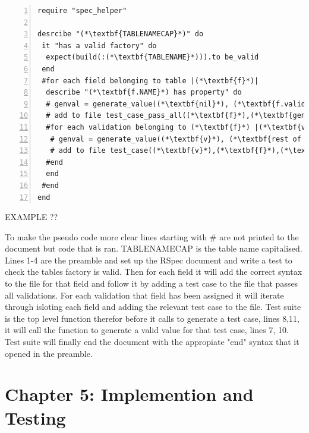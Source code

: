 \documentclass[a4paper,12pt]{article}
\begin{document}
\begin{lstlisting}[frame=single,numbers=left,caption= {Pseudo code for value generation} label={psuedo:suite}]
require "spec_helper"

desrcibe "(*\textbf{TABLENAMECAP}*)" do
 it "has a valid factory" do
  expect(build(:(*\textbf{TABLENAME}*))).to be_valid
 end
 #for each field belonging to table |(*\textbf{f}*)|
  describe "(*\textbf{f.NAME}*) has property" do
  # genval = generate_value((*\textbf{nil}*), (*\textbf{f.validations}*))
  # add to file test_case_pass_all((*\textbf{f}*),(*\textbf{genval}*))
  #for each validation belonging to (*\textbf{f}*) |(*\textbf{v}*)|
   # genval = generate_value((*\textbf{v}*), (*\textbf{rest of validations}*))
   # add to file test_case((*\textbf{v}*),(*\textbf{f}*),(*\textbf{genval}*))
  #end
  end
 #end
end
\end{lstlisting}
\par EXAMPLE ??
\par To make the pseudo code more clear lines starting with \# are not printed to the document but code that is ran. TABLENAMECAP is the table name capitalised. Lines 1-4 are the preamble and set up the RSpec document and write a test to check the tables factory is valid. Then for each field it will add the correct syntax to the file for that field and follow it by adding a test case to the file that passes all validations. For each validation that field has been assigned it will iterate through isloting each field and adding the relevant test case to the file. Test suite is the top level function therefor before it calls to generate a test case, lines 8,11, it will call the function to generate a valid value for that test case, lines 7, 10. Test suite will finally end the document with the appropiate "end"  syntax that it opened in the preamble.

\section{Chapter 5: Implemention and Testing}
\end{document}
